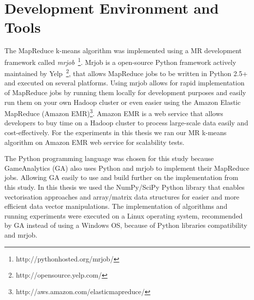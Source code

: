 \section{Development Environment and Tools}
The MapReduce k-means algorithm was implemented using a MR development framework called \textit{mrjob}~\footnote{http://pythonhosted.org/mrjob/}. Mrjob is a open-source Python framework actively maintained by Yelp~\footnote{http://opensource.yelp.com/}, that allows MapReduce jobs to be written in Python 2.5+ and executed on several platforms. Using mrjob allows for rapid implementation of MapReduce jobs by running them locally for development purposes and easily run them on your own Hadoop cluster or even easier using the Amazon Elastic MapReduce (Amazon EMR)\footnote{http://aws.amazon.com/elasticmapreduce/}. Amazon EMR is a web service that allows developers to buy time on a Hadoop cluster to process large-scale data easily and cost-effectively. For the experiments in this thesis we ran our MR k-means algorithm on Amazon EMR web service for scalability tests.

The Python programming language was chosen for this study because GameAnalytics (GA) also uses Python and mrjob to implement their MapReduce jobs. Allowing GA easily to use and build further on the implementation from this study. In this thesis we used the NumPy/SciPy Python library that enables vectorisation approaches and array/matrix data structures for easier and more efficient data vector manipulations. The implementation of algorithms and running experiments were executed on a Linux operating system, recommended by GA instead of using a Windows OS, because of Python libraries compatibility and mrjob.
